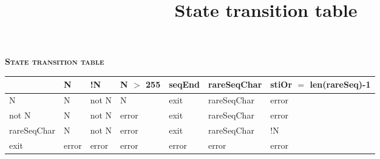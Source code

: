 \documentclass[12pt]{article}
\title {State transition table}
\begin{document}
	\begin{center}
		{\large \textbf{\textsc{State transition table}}}\\\vspace{12mm}

		\begin{tabular}{ | l | l | l | l | l | l | l |}
			\hline
    			& N & !N & N $>$ 255 & seqEnd & rareSeqChar & stiOr $=$ len(rareSeq)-1 \\ \hline
			N & N & not N & N & exit & rareSeqChar & error	 		       \\ \hline
			not N & N & not N & error & exit & rareSeqChar & error		       \\ \hline
			rareSeqChar & N & not N & error & exit & rareSeqChar & !N	       \\ \hline
			exit  & error & error & error & error & error & error		       \\ \hline
				
		\end{tabular}
	\end{center}
\end{document}

